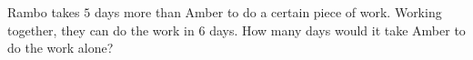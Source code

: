 Rambo takes $5$ days more than Amber to do a certain piece of work. Working together, they can do the work in $6$ days. How many days would it take Amber to do the work alone?
